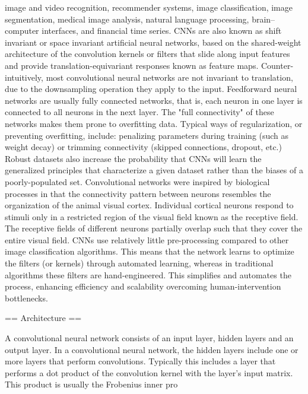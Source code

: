 \documentclass[12pt,a4paper]{report}
\begin{document}
image and video recognition,
recommender systems,
image classification,
image segmentation,
medical image analysis,
natural language processing,
brain–computer interfaces, and
financial time series.
CNNs are also known as shift invariant or space invariant artificial neural networks, based on the shared-weight architecture of the convolution kernels or filters that slide along input features and provide translation-equivariant responses known as feature maps. Counter-intuitively, most convolutional neural networks are not invariant to translation, due to the downsampling operation they apply to the input.
Feedforward neural networks are usually fully connected networks, that is, each neuron in one layer is connected to all neurons in the next layer. The "full connectivity" of these networks makes them prone to overfitting data. Typical ways of regularization, or preventing overfitting, include: penalizing parameters during training (such as weight decay) or trimming connectivity (skipped connections, dropout, etc.) Robust datasets also increase the probability that CNNs will learn the generalized principles that characterize a given dataset rather than the biases of a poorly-populated set.
Convolutional networks were inspired by biological processes in that the connectivity pattern between neurons resembles the organization of the animal visual cortex. Individual cortical neurons respond to stimuli only in a restricted region of the visual field known as the receptive field. The receptive fields of different neurons partially overlap such that they cover the entire visual field.
CNNs use relatively little pre-processing compared to other image classification algorithms. This means that the network learns to optimize the filters (or kernels) through automated learning, whereas in traditional algorithms these filters are hand-engineered. This simplifies and automates the process, enhancing efficiency and scalability overcoming human-intervention bottlenecks.


== Architecture ==

A convolutional neural network consists of an input layer, hidden layers and an output layer. In a convolutional neural network, the hidden layers include one or more layers that perform convolutions. Typically this includes a layer that performs a dot product of the convolution kernel with the layer's input matrix. This product is usually the Frobenius inner pro
\end{document}
